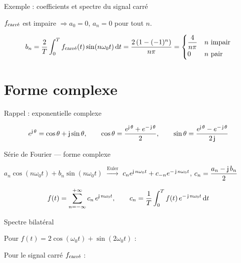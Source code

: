 \documentclass[aspectratio=43,10pt]{beamer}
\newcommand{\slidefig}[2]{%
\begin{center}
\resizebox{#1}{!}{}
\end{center}
}
\begin{document}
\begin{frame}{Exemple : coefficients et spectre du signal carré}
    \small
    \begin{center}$f_{\rm carr\acute{e}}$ est impaire $\Rightarrow a_0=0$, $a_n=0$ pour tout $n$.\end{center}
    \[
        b_n = \frac2T\int_0^T f_{\rm carr\acute{e}}(t)\sin(n\omega_0 t)\,{\rm d} t
        = \frac{2\left(1-(-1)^n\right)}{n\pi}
        = \begin{cases} \dfrac{4}{n\pi} & n\text{ impair} \\ 0 & n\text{ pair} \end{cases}
    \]
    \slidefig{0.55\textwidth}{spectre-carre.tex}
\end{frame}

\section{Forme complexe}

\begin{frame}{Rappel : exponentielle complexe}
    \slidefig{0.32\textwidth}{complex-exponential.tex}
    \[
        e^{\operatorname{\mathsf{j}}\theta}=\cos\theta+\operatorname{\mathsf{j}}\sin\theta, \qquad
        \cos\theta=\frac{e^{\operatorname{\mathsf{j}}\theta}+e^{-\operatorname{\mathsf{j}}\theta}}{2}, \qquad
        \sin\theta=\frac{e^{\operatorname{\mathsf{j}}\theta}-e^{-\operatorname{\mathsf{j}}\theta}}{2\operatorname{\mathsf{j}}}
    \]
\end{frame}

\begin{frame}{Série de Fourier --- forme complexe}
    \begin{center}
        \small
        $a_n\cos(n\omega_0 t)+b_n\sin(n\omega_0 t)$
        \quad$\xrightarrow{\text{Euler}}$\quad
        $c_n e^{\operatorname{\mathsf{j}} n\omega_0 t} + c_{-n} e^{-\operatorname{\mathsf{j}} n\omega_0 t}$,
        \quad $c_n=\dfrac{a_n-\operatorname{\mathsf{j}} b_n}{2}$
    \end{center}
    \begin{theorem}
        \[
            f(t) = \sum_{n=-\infty}^{+\infty} c_n\, e^{\operatorname{\mathsf{j}} n\omega_0 t},
            \qquad
            c_n=\frac1T\int_0^T f(t)\,e^{-\operatorname{\mathsf{j}} n\omega_0 t}\,{\rm d} t
        \]
    \end{theorem}
\end{frame}

\begin{frame}{Spectre bilatéral}
    \begin{overprint}
    \begin{center}\small Pour $f(t)=2\cos(\omega_0 t)+\sin(2\omega_0 t)$ :\end{center}
    \slidefig{0.6\textwidth}{spectre-bilateral-simple-example.tex}
    \begin{center}\small Pour le signal carré $f_{\rm carr\acute{e}}$ :\end{center}
    \slidefig{0.7\textwidth}{spectre-bilateral.tex}
    \end{overprint}
\end{frame}
\end{document}

